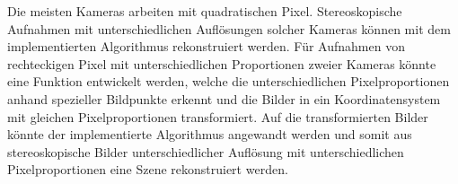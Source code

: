 Die meisten Kameras arbeiten mit quadratischen Pixel. Stereoskopische Aufnahmen mit unterschiedlichen Auflösungen solcher Kameras können mit dem implementierten Algorithmus rekonstruiert werden. Für Aufnahmen von rechteckigen Pixel mit unterschiedlichen Proportionen zweier Kameras könnte eine Funktion entwickelt werden, welche die unterschiedlichen Pixelproportionen anhand spezieller Bildpunkte erkennt und die Bilder in ein Koordinatensystem mit gleichen Pixelproportionen transformiert. Auf die transformierten Bilder könnte der implementierte Algorithmus angewandt werden und somit aus stereoskopische Bilder unterschiedlicher Auflösung mit unterschiedlichen Pixelproportionen eine Szene rekonstruiert werden.  



%
%
%
%
